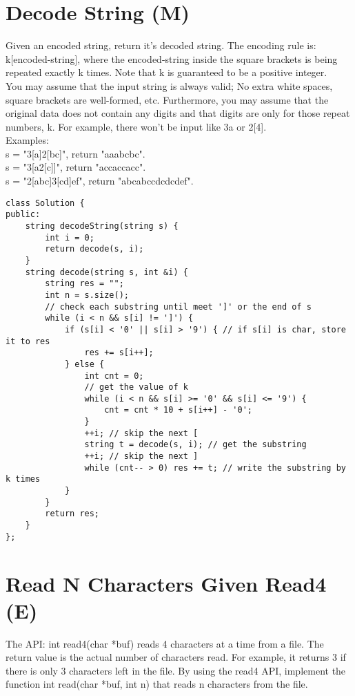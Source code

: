 \section{Decode String (M)}
Given an encoded string, return it's decoded string. The encoding rule is: k[encoded-string], where the encoded-string inside the square brackets is being repeated exactly k times. Note that k is guaranteed to be a positive integer.\\

You may assume that the input string is always valid; No extra white spaces, square brackets are well-formed, etc. Furthermore, you may assume that the original data does not contain any digits and that digits are only for those repeat numbers, k. For example, there won't be input like 3a or 2[4].\\

Examples:\\
s = "3[a]2[bc]", return "aaabcbc".\\
s = "3[a2[c]]", return "accaccacc".\\
s = "2[abc]3[cd]ef", return "abcabccdcdcdef".\\

\begin{lstlisting}
class Solution {
public:
    string decodeString(string s) {
        int i = 0;
        return decode(s, i);
    }
    string decode(string s, int &i) {
        string res = "";
        int n = s.size();
        // check each substring until meet ']' or the end of s
        while (i < n && s[i] != ']') { 
            if (s[i] < '0' || s[i] > '9') { // if s[i] is char, store it to res
                res += s[i++];
            } else {
                int cnt = 0;
                // get the value of k
                while (i < n && s[i] >= '0' && s[i] <= '9') {
                    cnt = cnt * 10 + s[i++] - '0';
                }
                ++i; // skip the next [
                string t = decode(s, i); // get the substring
                ++i; // skip the next ]
                while (cnt-- > 0) res += t; // write the substring by k times
            }
        }
        return res;
    }
};
\end{lstlisting}


\section{Read N Characters Given Read4 (E)}
The API: int read4(char *buf) reads 4 characters at a time from a file. The return value is the actual number of characters read. For example, it returns 3 if there is only 3 characters left in the file. By using the read4 API, implement the function int read(char *buf, int n) that reads n characters from the file.\\


